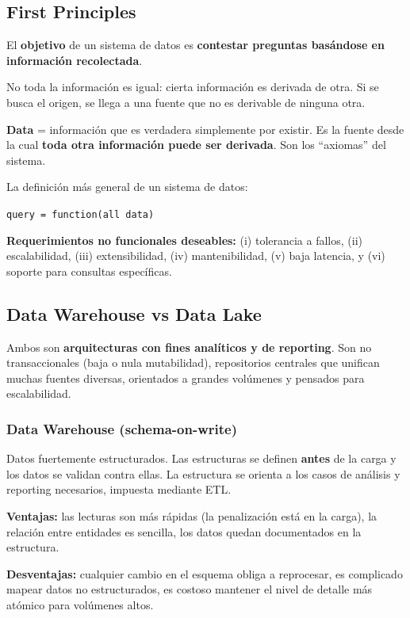 \documentclass[11pt, a4paper]{article}
\begin{document}
\subsection{First Principles}

El \textbf{objetivo} de un sistema de datos es \textbf{contestar preguntas basándose en información recolectada}.

No toda la información es igual: cierta información es derivada de otra. Si se busca el origen, se llega a una fuente que no es derivable de ninguna otra.

\textbf{Data} = información que es verdadera simplemente por existir. Es la fuente desde la cual \textbf{toda otra información puede ser derivada}. Son los ``axiomas'' del sistema.

La definición más general de un sistema de datos:

\begin{center}
	\large\texttt{query = function(all data)}
\end{center}

\textbf{Requerimientos no funcionales deseables:} (i) tolerancia a fallos, (ii) escalabilidad, (iii) extensibilidad, (iv) mantenibilidad, (v) baja latencia, y (vi) soporte para consultas específicas.

\subsection{Data Warehouse vs Data Lake}

Ambos son \textbf{arquitecturas con fines analíticos y de reporting}. Son no transaccionales (baja o nula mutabilidad), repositorios centrales que unifican muchas fuentes diversas, orientados a grandes volúmenes y pensados para escalabilidad.

\subsubsection{Data Warehouse (schema-on-write)}

Datos fuertemente estructurados. Las estructuras se definen \textbf{antes} de la carga y los datos se validan contra ellas. La estructura se orienta a los casos de análisis y reporting necesarios, impuesta mediante ETL.

\textbf{Ventajas:} las lecturas son más rápidas (la penalización está en la carga), la relación entre entidades es sencilla, los datos quedan documentados en la estructura.

\textbf{Desventajas:} cualquier cambio en el esquema obliga a reprocesar, es complicado mapear datos no estructurados, es costoso mantener el nivel de detalle más atómico para volúmenes altos.
\end{document}

